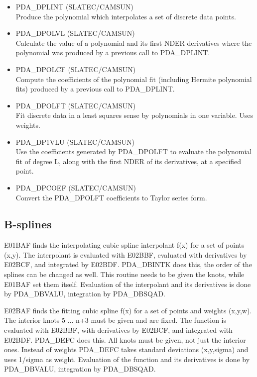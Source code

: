 \documentclass[11pt,twoside]{article}
\newcommand{\htmlref}[2]{#1}
\newcommand{\xlabel}[1]{}
\begin{document}
\begin{itemize}
\item \htmlref{PDA\_DPLINT}{PDA\_DPLINT} (SLATEC/CAMSUN)\ \\
   Produce the polynomial which interpolates a set of discrete data
   points.
\item \htmlref{PDA\_DPOLVL}{PDA\_DPOLVL} (SLATEC/CAMSUN)\ \\
   Calculate the value of a polynomial and its first NDER derivatives
   where the polynomial was produced by a previous call to PDA\_DPLINT.
\item \htmlref{PDA\_DPOLCF}{PDA\_DPOLCF} (SLATEC/CAMSUN)\ \\
   Compute the coefficients of the polynomial fit (including Hermite
   polynomial fits) produced by a previous call to PDA\_DPLINT.

\item \htmlref{PDA\_DPOLFT}{PDA\_DPOLFT} (SLATEC/CAMSUN)\ \\
   Fit discrete data in a least squares sense by polynomials in one
   variable. Uses weights.
\item \htmlref{PDA\_DP1VLU}{PDA\_DP1VLU} (SLATEC/CAMSUN)\ \\
   Use the coefficients generated by PDA\_DPOLFT to evaluate the
   polynomial fit of degree L, along with the first NDER of its
   derivatives, at a specified point.
\item \htmlref{PDA\_DPCOEF}{PDA\_DPCOEF} (SLATEC/CAMSUN)\ \\
   Convert the PDA\_DPOLFT coefficients to Taylor series form.

\end{itemize}


\subsection{\xlabel{b-splines}B-splines}

   E01BAF finds the interpolating cubic spline interpolant f(x) for a
   set of points (x,y). The interpolant is evaluated with E02BBF,
   evaluated with
   derivatives by E02BCF, and integrated by E02BDF. PDA\_DBINTK
   does this, the order of the splines can be changed as well. This
   routine needs to be given the knots, while E01BAF set them itself.
   Evaluation of the interpolant and its derivatives is done by
   PDA\_DBVALU, integration by PDA\_DBSQAD.

   E02BAF finds the fitting cubic spline f(x) for a set of points and
   weights (x,y,w). The interior knots 5 ... n+3 must be given and are
   fixed. The function is evaluated with E02BBF, with derivatives by
   E02BCF, and integrated with E02BDF. PDA\_DEFC does this. All knots must be
   given, not just the interior ones.
   Instead of weights PDA\_DEFC takes standard deviations (x,y,sigma) and uses
   1/sigma as weight. Evaluation of the function and its derivatives is
   done by PDA\_DBVALU, integration by PDA\_DBSQAD. 
\end{document}
